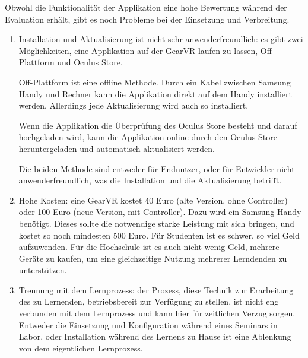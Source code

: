 Obwohl die Funktionalität der Applikation eine hohe Bewertung während der Evaluation erhält, gibt es noch Probleme bei der Einsetzung und Verbreitung.
\begin{enumerate}

\item Installation und Aktualisierung ist nicht sehr anwenderfreundlich: es gibt zwei Möglichkeiten, eine Applikation auf der GearVR laufen zu lassen, Off-Plattform und Oculus Store.

Off-Plattform ist eine offline Methode. Durch ein Kabel zwischen Samsung Handy und Rechner kann die Applikation direkt auf dem Handy installiert werden. Allerdings jede Aktualisierung wird auch so installiert.

Wenn die Applikation die Überprüfung des Oculus Store besteht und darauf hochgeladen wird, kann die Applikation online durch den Oculus Store heruntergeladen und automatisch aktualisiert werden.

Die beiden Methode sind entweder für Endnutzer, oder für Entwickler nicht anwenderfreundlich, was die Installation und die Aktualisierung betrifft.

\item Hohe Kosten: eine GearVR kostet 40 Euro (alte Version, ohne Controller) oder 100 Euro (neue Version, mit Controller). Dazu wird ein Samsung Handy benötigt. Dieses sollte die notwendige starke Leistung mit sich bringen, und kostet so noch mindesten 500 Euro. Für Studenten ist es schwer, so viel Geld aufzuwenden. Für die Hochschule ist es auch nicht wenig Geld, mehrere Geräte zu kaufen, um eine gleichzeitige Nutzung mehrerer Lerndenden zu unterstützen.

\item Trennung mit dem Lernprozess: der Prozess, diese Technik zur Erarbeitung des zu Lernenden, betriebsbereit zur Verfügung zu stellen, ist nicht eng verbunden mit dem Lernprozess und kann hier für zeitlichen Verzug sorgen. Entweder die Einsetzung und Konfiguration während eines Seminars in Labor, oder Installation während des Lernens zu Hause ist eine Ablenkung von dem eigentlichen Lernprozess.
\end{enumerate}


